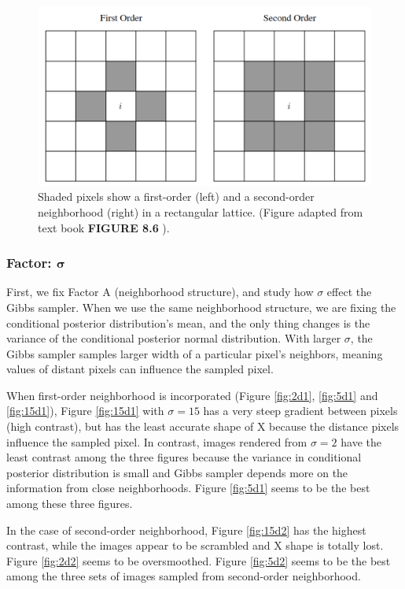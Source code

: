 \begin{figure}[h]
    \centering
    \includegraphics[scale=0.5]{./img/orderillus.png}
    \caption{Shaded pixels show a first-order (left) and a second-order neighborhood (right) in a rectangular lattice. (Figure adapted from text book \textbf{FIGURE 8.6} \cite{Givens}).}
    \label{fig:neiborill}
\end{figure}
\subsubsection{Factor: $\mathbf{\sigma}$}
First, we fix Factor A (neighborhood structure), and study how $\sigma$ effect the Gibbs sampler.
When we use the same neighborhood structure, we are fixing the conditional posterior distribution's mean, and the only thing changes is the variance of the conditional posterior normal distribution.
With larger $\sigma$, the Gibbs sampler samples larger width of a particular pixel's neighbors, meaning values of distant pixels can influence the sampled pixel. 

When first-order neighborhood is incorporated (Figure \ref{fig:2d1}, \ref{fig:5d1} and \ref{fig:15d1}), Figure \ref{fig:15d1} with $\sigma=15$ has a very steep gradient between pixels (high contrast), but has the least accurate shape of X because the distance pixels influence the sampled pixel. 
In contrast, images rendered from $\sigma=2$ have the least contrast among the three figures because the variance in conditional posterior distribution is small and Gibbs sampler depends more on the information from close neighborhoods. 
Figure \ref{fig:5d1} seems to be the best among these three figures. 

In the case of second-order neighborhood, Figure \ref{fig:15d2} has the highest contrast, while the images appear to be scrambled and X shape is totally lost. 
Figure \ref{fig:2d2} seems to be oversmoothed. Figure \ref{fig:5d2} seems to be the best among the three sets of images sampled from second-order neighborhood. 


